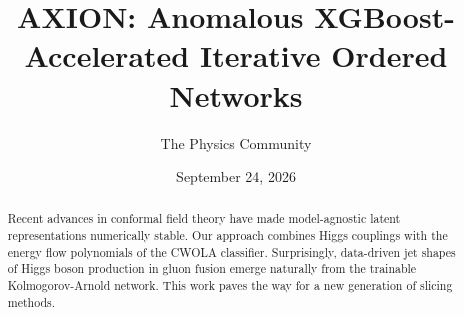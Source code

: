 \documentclass[11pt]{article}
\title{AXION: Anomalous XGBoost-Accelerated Iterative Ordered Networks}
\author{The Physics Community}
\date{September 24, 2026}
\numberwithin{equation}{section}
\theoremstyle{definition}
\theoremstyle{remark}
\begin{document}
\maketitle
\begin{abstract}
Recent advances in conformal field theory have made model-agnostic
latent representations numerically stable. Our approach combines Higgs
couplings with the energy flow polynomials of the CWOLA classifier.
Surprisingly, data-driven jet shapes of Higgs boson production in gluon
fusion emerge naturally from the trainable Kolmogorov-Arnold network.
This work paves the way for a new generation of slicing methods.
\end{abstract}
\tableofcontents





\nocite{*}


\end{document}
